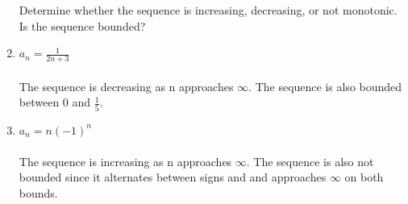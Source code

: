 \documentclass[12pt]{article}
\begin{document}
\begin{enumerate}
    Determine whether the sequence is increasing, decreasing, or not monotonic. Is the sequence bounded?
    \addtocounter{enumi}{19}\item $a_n=\frac{1}{2n+3}$\\\\
    The sequence is decreasing as n approaches $\infty$. The sequence is also bounded between 0 and $\frac{1}{5}$.
    \addtocounter{enumi}{1}\item $a_n=n(-1)^n$\\\\
    The sequence is increasing as n approaches $\infty$. The sequence is also not bounded since it alternates between signs and and approaches $\infty$ on both bounds.
    
    
\end{enumerate}
\end{document}
